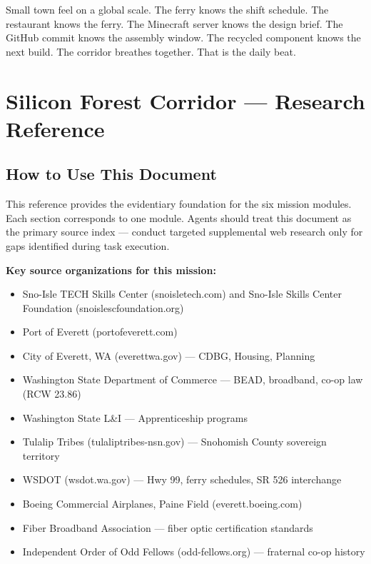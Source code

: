 \documentclass[11pt,letterpaper]{article}
\newcommand{\stageheader}[2]{%
  \noindent\colorbox{#2}{\makebox[\textwidth][l]{%
    \textcolor{white}{\bfseries\sffamily\hspace{6pt}#1\hspace{6pt}}}}%
  \vspace{0.5em}\par%
}
\begin{document}
Small town feel on a global scale. The ferry knows the shift schedule. The restaurant knows the ferry. The Minecraft server knows the design brief. The GitHub commit knows the assembly window. The recycled component knows the next build. The corridor breathes together. That is the daily beat.

\newpage

\stageheader{STAGE 2 --- RESEARCH REFERENCE}{secondary}

\section{Silicon Forest Corridor --- Research Reference}

\subsection{How to Use This Document}

This reference provides the evidentiary foundation for the six mission modules. Each section corresponds to one module. Agents should treat this document as the primary source index --- conduct targeted supplemental web research only for gaps identified during task execution.

\textbf{Key source organizations for this mission:}
\begin{itemize}[leftmargin=*]
  \item Sno-Isle TECH Skills Center (snoisletech.com) and Sno-Isle Skills Center Foundation (snoislescfoundation.org)
  \item Port of Everett (portofeverett.com)
  \item City of Everett, WA (everettwa.gov) --- CDBG, Housing, Planning
  \item Washington State Department of Commerce --- BEAD, broadband, co-op law (RCW 23.86)
  \item Washington State L\&I --- Apprenticeship programs
  \item Tulalip Tribes (tulaliptribes-nsn.gov) --- Snohomish County sovereign territory
  \item WSDOT (wsdot.wa.gov) --- Hwy 99, ferry schedules, SR 526 interchange
  \item Boeing Commercial Airplanes, Paine Field (everett.boeing.com)
  \item Fiber Broadband Association --- fiber optic certification standards
  \item Independent Order of Odd Fellows (odd-fellows.org) --- fraternal co-op history
\end{itemize}
\end{document}
